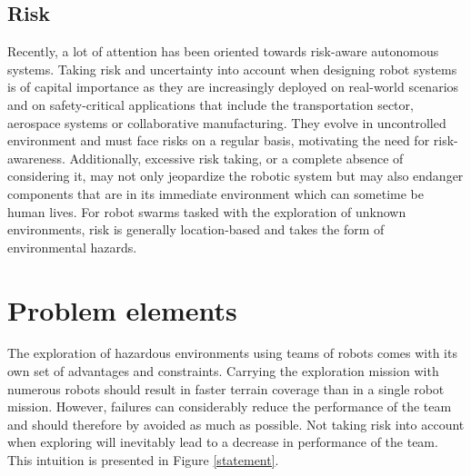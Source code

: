 \subsection{Risk}
Recently, a lot of attention has been oriented towards risk-aware autonomous systems. Taking risk and uncertainty into account when designing robot systems is of capital importance as they are increasingly deployed on real-world scenarios and on safety-critical applications that include the transportation sector, aerospace systems or collaborative manufacturing. They evolve in uncontrolled environment and must face risks on a regular basis, motivating the need for risk-awareness. Additionally, excessive risk taking, or a complete absence of considering it, may not only jeopardize the robotic system but may also endanger components that are in its immediate environment which can sometime be human lives. For robot swarms tasked with the exploration of unknown environments, risk is generally location-based and takes the form of environmental hazards. 


\section{Problem elements}  %
The exploration of hazardous environments using teams of robots comes with its own set of advantages and constraints.  Carrying the exploration mission with numerous robots should result in faster terrain coverage than in a single robot mission.  However, failures can considerably reduce the performance of the team and should therefore by avoided as much as possible. Not taking risk into account when exploring will inevitably lead to a decrease in performance of the team. This intuition is presented in Figure \ref{statement}.

